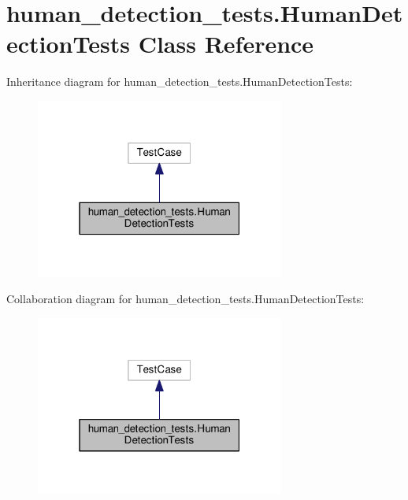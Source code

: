 \hypertarget{classhuman__detection__tests_1_1HumanDetectionTests}{\section{human\-\_\-detection\-\_\-tests.\-Human\-Detection\-Tests Class Reference}
\label{classhuman__detection__tests_1_1HumanDetectionTests}
}


Inheritance diagram for human\-\_\-detection\-\_\-tests.\-Human\-Detection\-Tests\-:
\nopagebreak
\begin{figure}[H]
\begin{center}
\leavevmode
\includegraphics[width=232pt]{classhuman__detection__tests_1_1HumanDetectionTests__inherit__graph}
\end{center}
\end{figure}


Collaboration diagram for human\-\_\-detection\-\_\-tests.\-Human\-Detection\-Tests\-:
\nopagebreak
\begin{figure}[H]
\begin{center}
\leavevmode
\includegraphics[width=232pt]{classhuman__detection__tests_1_1HumanDetectionTests__coll__graph}
\end{center}
\end{figure}
